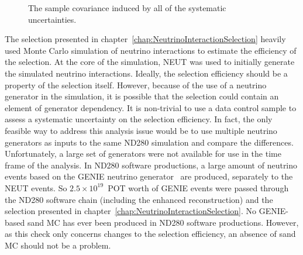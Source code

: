 \begin{figure}%
  \centering
  \caption{The sample covariance induced by all of the systematic uncertainties.}
  \label{fig:TotalCovarianceMatrices}
\end{figure}
\newline
\newline
The selection presented in chapter~\ref{chap:NeutrinoInteractionSelection} heavily used Monte Carlo simulation of neutrino interactions to estimate the efficiency of the selection.  At the core of the simulation, NEUT was used to initially generate the simulated neutrino interactions.  Ideally, the selection efficiency should be a property of the selection itself.  However, because of the use of a neutrino generator in the simulation, it is possible that the selection could contain an element of generator dependency.  It is non-trivial to use a data control sample to assess a systematic uncertainty on the selection efficiency.  In fact, the only feasible way to address this analysis issue would be to use multiple neutrino generators as inputs to the same ND280 simulation and compare the differences.  Unfortunately, a large set of generators were not available for use in the time frame of the analysis.  In ND280 software productions, a large amount of neutrino events based on the GENIE neutrino generator~\cite{Andreopoulos201087} are produced, separately to the NEUT events.  So $2.5\times 10^{19}$~POT worth of GENIE events were passed through the ND280 software chain (including the enhanced reconstruction) and the selection presented in chapter~\ref{chap:NeutrinoInteractionSelection}.  No GENIE-based sand MC has ever been produced in ND280 software productions.  However, as this check only concerns changes to the selection efficiency, an absence of sand MC should not be a problem.  

